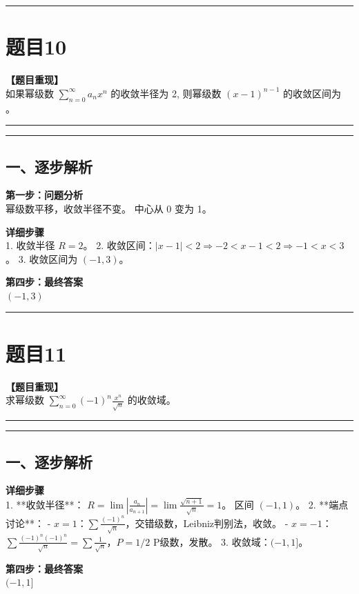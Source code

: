 \documentclass[12pt, a4paper]{ctexart}
\newcommand{\TopSeparator}{
    \par\noindent\rule{\textwidth}{1.5pt}\vspace{0.5em} %
}
\newcommand{\AnalysisSeparator}{
    \par\noindent\rule{\textwidth}{0.5pt}\vspace{0.2em}\hrule\vspace{0.5em} %
}
\newenvironment{RedAnalysis}{
    \par
    \color{red} %
}{
    \par
    \color{black} %
}
\begin{document}
\vspace{2em}

\TopSeparator
\section*{题目10}

\textbf{【题目重现】} \\
如果幂级数 $ \sum_{n=0}^{\infty} a_{n} x^{n} $ 的收敛半径为 2, 则幂级数 $ (x-1)^{n-1} $ 的收敛区间为 \underline{\hspace{2cm}}。 

\AnalysisSeparator

\begin{RedAnalysis}

\subsection*{一、逐步解析}

\textbf{第一步：问题分析} \\
幂级数平移，收敛半径不变。
中心从 0 变为 1。

\textbf{详细步骤} \\
1. 收敛半径 $R=2$。
2. 收敛区间：$|x-1| < 2 \Rightarrow -2 < x-1 < 2 \Rightarrow -1 < x < 3$。
3. 收敛区间为 $(-1, 3)$。

\textbf{第四步：最终答案} \\
$ (-1, 3) $

\end{RedAnalysis}

\vspace{2em}

\TopSeparator
\section*{题目11}

\textbf{【题目重现】} \\
求幂级数 $ \sum_{n=0}^{\infty} (-1)^{n} \frac{x^{n}}{\sqrt{n}} $ 的收敛域。

\AnalysisSeparator

\begin{RedAnalysis}

\subsection*{一、逐步解析}

\textbf{详细步骤} \\
1. **收敛半径**：
   $R = \lim |\frac{a_n}{a_{n+1}}| = \lim \frac{\sqrt{n+1}}{\sqrt{n}} = 1$。
   区间 $(-1, 1)$。
2. **端点讨论**：
   - $x=1$：$\sum \frac{(-1)^n}{\sqrt{n}}$，交错级数，Leibniz判别法，收敛。
   - $x=-1$：$\sum \frac{(-1)^n (-1)^n}{\sqrt{n}} = \sum \frac{1}{\sqrt{n}}$，$P=1/2$ P级数，发散。
3. 收敛域：$(-1, 1]$。

\textbf{第四步：最终答案} \\
$ (-1, 1] $

\end{RedAnalysis}
\end{document}
